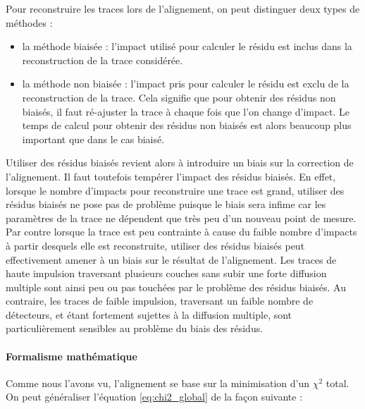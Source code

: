    Pour reconstruire les traces lors de l'alignement, on peut distinguer deux types de m\'ethodes :
   
   \medskip
   
   \renewcommand{\labelitemi}{$\bullet$}
   
   \begin{itemize}
    \item la m\'ethode biais\'ee : l'impact utilis\'e pour calculer le r\'esidu est inclus dans la reconstruction de la trace consid\'er\'ee.
    \item la m\'ethode non biais\'ee : l'impact pris pour calculer le r\'esidu est exclu de la reconstruction de la trace. Cela signifie que pour obtenir des r\'esidus non biais\'es, il faut r\'e-ajuster la trace \`a chaque fois que l'on change d'impact. Le temps de calcul pour obtenir des r\'esidus non biais\'es est alors beaucoup plus important que dans le cas biais\'e.
   \end{itemize}
   
   \medskip
   
   Utiliser des r\'esidus biais\'es revient alors \`a introduire un biais sur la correction de l'alignement. Il faut toutefois temp\'erer l'impact des r\'esidus biais\'es. En effet, lorsque le nombre d'impacts pour reconstruire une trace est grand, utiliser des r\'esidus biais\'es ne pose pas de probl\`eme puisque le biais sera infime car les param\`etres de la trace ne d\'ependent que tr\`es peu d'un nouveau point de mesure. Par contre lorsque la trace est peu contrainte \`a cause du faible nombre d'impacts \`a partir desquels elle est reconstruite, utiliser des r\'esidus biais\'es peut effectivement amener \`a un biais sur le r\'esultat de l'alignement. Les traces de haute impulsion traversant plusieurs couches sans subir une forte diffusion multiple sont ainsi peu ou pas touch\'ees par le probl\`eme des r\'esidus biais\'es. Au contraire, les traces de faible impulsion, traversant un faible nombre de d\'etecteurs, et \'etant fortement sujettes \`a la diffusion multiple, sont particuli\`erement sensibles au probl\`eme du biais des r\'esidus.
   
   \paragraph{Formalisme math\'ematique}
   
   Comme nous l'avons vu, l'alignement se base sur la minimisation d'un $\chi^2$ total. On peut g\'en\'eraliser l'\'equation \ref{eq:chi2_global} de la façon suivante : 
   
